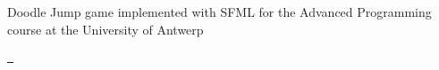 Doodle Jump game implemented with SFML for the Advanced Programming course at the University of Antwerp

\href{https://circleci.com/gh/pabloDeputter/Advanced-Programming-DoodleJump/tree/main}{\texttt{ }} 